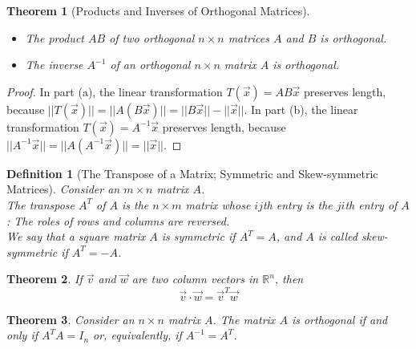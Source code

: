 \documentclass[10pt]{report}
\newtheorem{thm2}{Theorem}[section]
\newtheorem{def2}{Definition}[section]
\begin{document}
\begin{thm2}[Products and Inverses of Orthogonal Matrices]
\begin{itemize}
\item[a.] The product $AB$ of two orthogonal $n\times n$ matrices $A$ and $B$ is orthogonal.
\item[b.] The inverse $A^{-1}$ of an orthogonal $n\times n$ matrix $A$ is orthogonal.
\end{itemize}
\end{thm2}
\begin{proof}
In part (a), the linear transformation $T(\vec{x})=AB\vec{x}$ preserves length, because $||T(\vec{x})|| = ||A(B\vec{x})|| = ||B\vec{x}|| - ||\vec{x}||$. In part (b), the linear transformation $T(\vec{x}) = A^{-1}\vec{x}$ preserves length, because $||A^{-1}\vec{x}|| = ||A(A^{-1}\vec{x})|| = ||\vec{x}||$.
\end{proof}
\begin{def2}[The Transpose of a Matrix; Symmetric and Skew-symmetric Matrices]
Consider an $m\times n$ matrix $A$.\\
The transpose $A^T$ of $A$ is the $n\times m$ matrix whose $ij$th entry is the $ji$th entry of $A$: The roles of rows and columns are reversed.\\
We say that a square matrix $A$ is symmetric if $A^T=A$, and $A$ is called skew-symmetric if $A^T=-A$.
\end{def2}
\begin{thm2}
If $\vec{v}$ and $\vec{w}$ are two column vectors in $\mathbb{R}^n$, then
$$\vec{v}\cdot \vec{w} = \vec{v}^T \vec{w}$$
\end{thm2}
\begin{thm2}
Consider an $n\times n$ matrix $A$. The matrix $A$ is orthogonal if and only if $A^TA = I_n$ or, equivalently, if $A^{-1} = A^T$.
\end{thm2}
\end{document}
